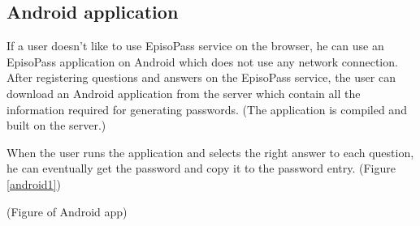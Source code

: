 \documentclass{article}
\begin{document}

\subsection{Android application}


If a user doesn't like to use EpisoPass service on the browser,
he can use an EpisoPass application on Android
which does not use any network connection.
After registering questions and answers on the EpisoPass service,
the user can download an Android application from the server
which contain all the information required for generating passwords.
(The application is compiled and built on the server.)


When the user runs the application and selects the right answer
to each question, he can eventually get the password and copy it to the password entry.
(Figure \ref{android1})

(Figure of Android app)

\end{document}
